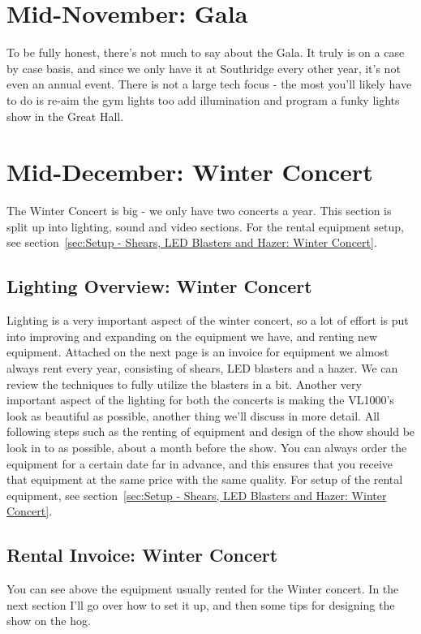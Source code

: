 \documentclass[11pt,a4paper]{book}
\begin{document}
\chapter{Mid-November: Gala}
To be fully honest, there's not much to say about the Gala. It truly is on a case by case basis, and since we only have it at Southridge every other year, it's not even an annual event. There is not a large tech focus - the most you'll likely have to do is re-aim the gym lights too add illumination and program a funky lights show in the Great Hall.
\chapter{Mid-December: Winter Concert}
The Winter Concert is big - we only have two concerts a year. This section is split up into lighting, sound and video sections. For the rental equipment setup, see section~\ref{sec:Setup - Shears, LED Blasters and Hazer: Winter Concert}. 
\section{Lighting Overview: Winter Concert}
Lighting is a very important aspect of the winter concert, so a lot of effort is put into improving and expanding on the equipment we have, and renting new equipment. Attached on the next page is an invoice for equipment we almost always rent every year, consisting of shears, LED blasters and a hazer. We can review the techniques to fully utilize the blasters in a bit. Another very important aspect of the lighting for both the concerts is making the VL1000's look as beautiful as possible, another thing we'll discuss in more detail. All following steps such as the renting of equipment and design of the show should be look in to as possible, about a month before the show. You can always order the equipment for a certain date far in advance, and this ensures that you receive that equipment at the same price with the same quality. For setup of the rental equipment, see section~\ref{sec:Setup - Shears, LED Blasters and Hazer: Winter Concert}.

\section{Rental Invoice: Winter Concert}


You can see above the equipment usually rented for the Winter concert. In the next section I'll go over how to set it up, and then some tips for designing the show on the hog.
\end{document}
